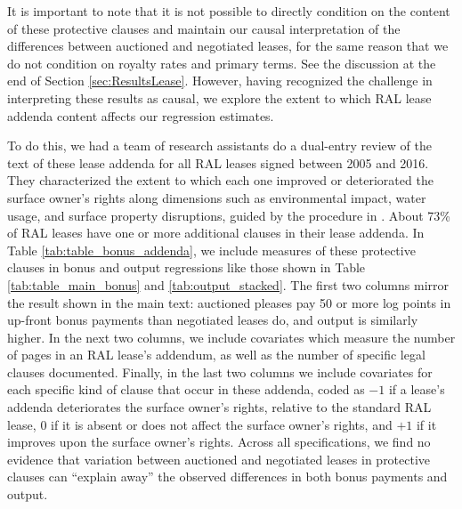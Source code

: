 \documentclass[12pt]{article}
\begin{document}
\begin{appendices}
It is important to note that it is not possible to directly condition on the content of these protective clauses and maintain our causal interpretation of the differences between auctioned and negotiated leases, for the same reason that we do not condition on royalty rates and primary terms.  See the discussion at the end of Section \ref{sec:ResultsLease}.  However, having recognized the challenge in interpreting these results as causal, we explore the extent to which RAL lease addenda content affects our regression estimates.

To do this, we had a team of research assistants do a dual-entry review of the text of these lease addenda for all RAL leases signed between 2005 and 2016.  They characterized the extent to which each one improved or deteriorated the surface owner's rights along dimensions such as environmental impact, water usage, and surface property disruptions, guided by the procedure in \cite{vissing_one--many_2017}.  About 73\% of RAL leases have one or more additional clauses in their lease addenda.  In Table \ref{tab:table_bonus_addenda}, we include measures of these protective clauses in bonus and output regressions like those shown in Table \ref{tab:table_main_bonus} and \ref{tab:output_stacked}.  The first two columns mirror the result shown in the main text: auctioned pleases pay 50 or more log points in up-front bonus payments than negotiated leases do, and output is similarly higher.  In the next two columns, we include covariates which measure the number of pages in an RAL lease's addendum, as well as the number of specific legal clauses documented.  Finally, in the last two columns we include covariates for each specific kind of clause that occur in these addenda, coded as $-1$ if a lease's addenda deteriorates the surface owner's rights, relative to the standard RAL lease, $0$ if it is absent or does not affect the surface owner's rights, and $+1$ if it improves upon the surface owner's rights.  Across all specifications, we find no evidence that variation between auctioned and negotiated leases in protective clauses can ``explain away'' the observed differences in both bonus payments and output. 


\end{appendices}
\end{document}
